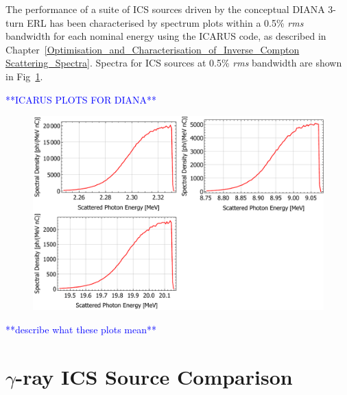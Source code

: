 \documentclass[../main.tex]{subfiles}
\begin{document}
The performance of a suite of ICS sources driven by the conceptual DIANA 3-turn ERL has been characterised by spectrum plots within a 0.5\% \textit{rms} bandwidth for each nominal energy using the ICARUS code, as described in Chapter~\ref{Optimisation_and_Characterisation_of_Inverse_Compton Scattering_Spectra}. Spectra for ICS sources at 0.5\% \textit{rms} bandwidth are shown in Fig~\ref{fig:DIANA_spectra}.

\textcolor{blue}{**ICARUS PLOTS FOR DIANA**}
\begin{figure}[!h]
\centering
\includegraphics[width=\textwidth]{Figures/DIANA_Inverse_Compton_Source_Design/DIANA_spectra.pdf}
\caption{}
\label{fig:DIANA_spectra}
\end{figure}

\textcolor{blue}{**describe what these plots mean**}

\section{$\gamma$-ray ICS Source Comparison}
\label{sec:gamma_ICS_comparison}
\end{document}
